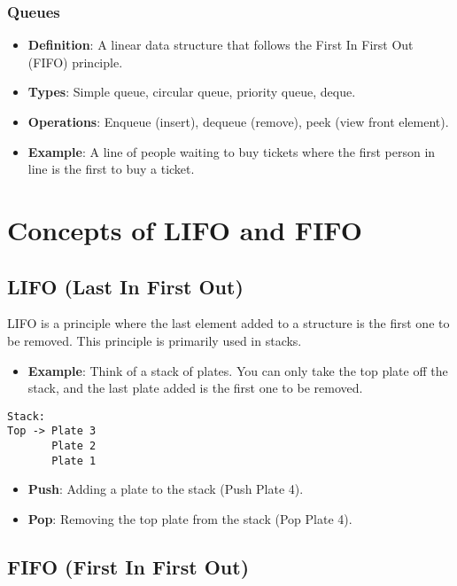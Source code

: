 \documentclass{article}
\begin{document}
\subsubsection{Queues}
\begin{itemize}
    \item \textbf{Definition}: A linear data structure that follows the First In First Out (FIFO) principle.
    \item \textbf{Types}: Simple queue, circular queue, priority queue, deque.
    \item \textbf{Operations}: Enqueue (insert), dequeue (remove), peek (view front element).
    \item \textbf{Example}: A line of people waiting to buy tickets where the first person in line is the first to buy a ticket.
\end{itemize}

\section{Concepts of LIFO and FIFO}

\subsection{LIFO (Last In First Out)}

LIFO is a principle where the last element added to a structure is the first one to be removed. This principle is primarily used in stacks.

\begin{itemize}
    \item \textbf{Example}: Think of a stack of plates. You can only take the top plate off the stack, and the last plate added is the first one to be removed.
\end{itemize}

\begin{verbatim}
Stack:
Top -> Plate 3
       Plate 2
       Plate 1
\end{verbatim}

\begin{itemize}
    \item \textbf{Push}: Adding a plate to the stack (Push Plate 4).
    \item \textbf{Pop}: Removing the top plate from the stack (Pop Plate 4).
\end{itemize}

\subsection{FIFO (First In First Out)}
\end{document}
